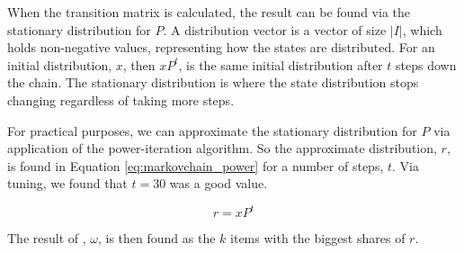 When the transition matrix is calculated, the result can be found via the stationary distribution for $P$. A distribution vector is a vector of size $|I|$, which holds non-negative values, representing how the states are distributed. For an initial distribution, $x$, then $xP^t$, is the same initial distribution after $t$ steps down the chain. The stationary distribution is where the state distribution stops changing regardless of taking more steps.

For practical purposes, we can approximate the stationary distribution for $P$ via application of the power-iteration algorithm. So the approximate distribution, $r$, is found in Equation \ref{eq:markovchain_power} for a number of steps, $t$. Via tuning, we found that $t = 30$ was a good value.

\begin{equation}\label{eq:markovchain_power}
r = xP^t
\end{equation}

The result of \MC, $\omega$, is then found as the $k$ items with the biggest shares of $r$.